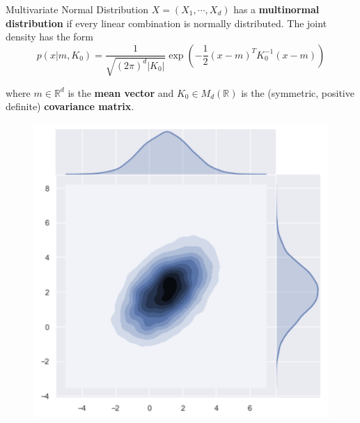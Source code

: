 \documentclass[10pt]{beamer}
\begin{document}
\begin{frame}{Multivariate Normal Distribution}{\cite{multivariate_normal_orduz_2019}}
$X = (X_1, \cdots, X_d)$ has a{ \bf multinormal distribution} if every linear combination is normally distributed. The joint density has the form
$$
p(x|m,K_0) =\frac{1}{\sqrt{(2\pi)^{d}|K_0|}}\exp\left(-\frac{1}{2}(x - m)^T K_0^{-1}(x - m)\right)
$$

where $m \in \mathbb{R}^d$ is the {\bf mean vector} and  $K_0 \in M_d(\mathbb{R})$ is the (symmetric, positive definite) {\bf covariance matrix}.

\begin{center}
\begin{figure}
\includegraphics[scale=0.15]{images/multinormal_density.png} 

\end{figure}
\end{center}
\end{frame}
\end{document}

